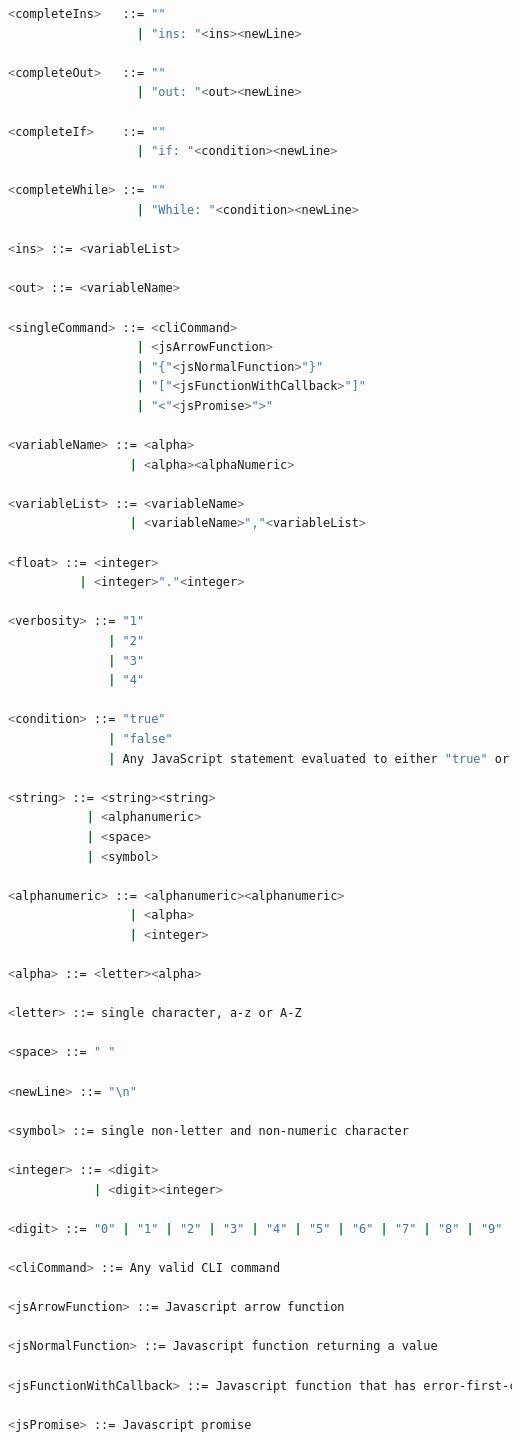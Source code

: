 \documentclass[conference]{IEEEtran}
\begin{document}
\begin{lstlisting}[caption=CHIML Semantic, label=chimlSemantic, language=bash, basicstyle=\small, breaklines=true]
<completeIns>   ::= ""
                  | "ins: "<ins><newLine>

<completeOut>   ::= ""
                  | "out: "<out><newLine>

<completeIf>    ::= ""
                  | "if: "<condition><newLine>

<completeWhile> ::= ""
                  | "While: "<condition><newLine>

<ins> ::= <variableList>

<out> ::= <variableName>

<singleCommand> ::= <cliCommand>
                  | <jsArrowFunction>
                  | "{"<jsNormalFunction>"}"
                  | "["<jsFunctionWithCallback>"]"
                  | "<"<jsPromise>">"

<variableName> ::= <alpha>
                 | <alpha><alphaNumeric>

<variableList> ::= <variableName>
                 | <variableName>","<variableList>

<float> ::= <integer>
          | <integer>"."<integer>

<verbosity> ::= "1"
              | "2"
              | "3"
              | "4"

<condition> ::= "true"
              | "false"
              | Any JavaScript statement evaluated to either "true" or "false"

<string> ::= <string><string>
           | <alphanumeric>
           | <space>
           | <symbol>

<alphanumeric> ::= <alphanumeric><alphanumeric>
                 | <alpha>
                 | <integer>

<alpha> ::= <letter><alpha>

<letter> ::= single character, a-z or A-Z

<space> ::= " "

<newLine> ::= "\n"

<symbol> ::= single non-letter and non-numeric character

<integer> ::= <digit>
            | <digit><integer>

<digit> ::= "0" | "1" | "2" | "3" | "4" | "5" | "6" | "7" | "8" | "9"

<cliCommand> ::= Any valid CLI command

<jsArrowFunction> ::= Javascript arrow function

<jsNormalFunction> ::= Javascript function returning a value

<jsFunctionWithCallback> ::= Javascript function that has error-first-callback

<jsPromise> ::= Javascript promise
\end{lstlisting}
\end{document}
